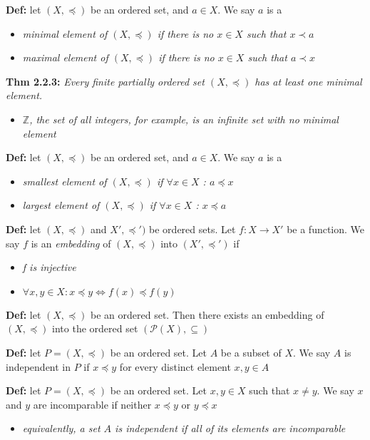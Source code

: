 \documentclass[12pt]{article}
\begin{document}
\textbf{Def: }let $(X, \preceq)$ be an ordered set, and $a 
\in X$. We say $a$ is a
\begin{itemize}
    \item \emph{minimal element of $(X, \preceq)$ if there is no $x \in X$ such that $x \prec a$}
    \item \emph{maximal element of $(X, \preceq)$ if there is no $x \in X$ such that $a \prec x$}
\end{itemize}

\textbf{Thm 2.2.3: }\emph{Every finite partially ordered set $(X, \preceq)$ has at least one minimal element.}
\begin{itemize}
    \item \emph{$\mathbb{Z}$, the set of all integers, for example, is an infinite set with no minimal element}
\end{itemize}

\textbf{Def: }let $(X, \preceq)$ be an ordered set, and $a 
\in X$. We say $a$ is a
\begin{itemize}
    \item \emph{smallest element of $(X, \preceq)$ if $\forall x \in X$ : $a \preceq x$}
    \item \emph{largest element of $(X, \preceq)$ if $\forall x \in X$ : $x \preceq a$}
\end{itemize}

\textbf{Def: }let $(X, \preceq)$ and $X', \preceq')$ be ordered sets. Let $f: X \rightarrow X'$ be a function. We say $f$ is an \emph{embedding} of $(X, \preceq)$ into $(X', \preceq')$ if
\begin{itemize}
    \item \emph{f is injective}
    \item $\forall x, y \in X : x \preceq y \Leftrightarrow f(x) \preceq f(y)$
\end{itemize}

\textbf{Def: }let $(X, \preceq)$ be an ordered set. Then there exists an embedding of $(X, \preceq)$ into the ordered set $(\mathcal{P}(X), \subseteq)$

\textbf{Def: }let $P = (X, \preceq)$ be an ordered set. Let $A$ be a subset of $X$. We say $A$ is independent in $P$ if $x \preceq y$ for every distinct element $x, y \in A$

\textbf{Def: }let $P = (X, \preceq)$ be an ordered set. Let $x, y \in X$ such that $x \neq y$. We say $x$ and $y$ are incomparable if neither $x \preceq y$ or $y \preceq x$
\begin{itemize}
    \item \emph{equivalently, a set $A$ is independent if all of its elements are incomparable}
\end{itemize}
\end{document}
